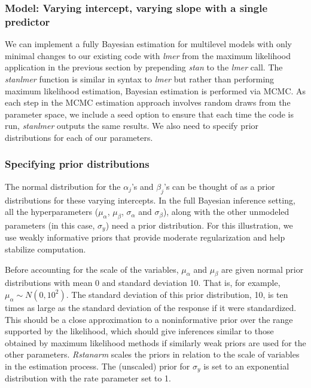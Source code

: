 \subsubsection*{Model: Varying intercept, varying slope with a single predictor}

We can implement a fully Bayesian estimation for multilevel models with only minimal changes to our existing code with \textit{lmer} from the maximum likelihood application in the previous section by prepending \textit{stan\textunderscore} to the \textit{lmer} call. The \textit{stan\textunderscore lmer} function is similar in syntax to \textit{lmer} but rather than performing maximum likelihood estimation, Bayesian estimation is performed via MCMC. As each step in the MCMC estimation approach involves random draws from the parameter space, we include a seed option to ensure that each time the code is run, \textit{stan\textunderscore lmer} outputs the same results. We also need to specify prior distributions for each of our parameters.

\subsubsection*{Specifying prior distributions}

The normal distribution for the $\alpha_{j}$'s and $\beta_{j}$'s can be thought of as a prior distributions for these varying intercepts. In the full Bayesian inference setting, all the hyperparameters ($\mu_{\alpha}$, $\mu_{\beta}$, $\sigma_{\alpha}$ and $\sigma_{\beta}$), along with the other unmodeled parameters (in this case, $\sigma_{y}$) need a prior distribution. For this illustration, we use weakly informative priors that provide moderate regularization and help stabilize computation.

Before accounting for the scale of the variables, $\mu_{\alpha}$ and $\mu_{\beta}$ are given normal prior distributions with mean 0 and standard deviation 10.  That is, for example, $\mu_{\alpha} \sim N(0, 10^2)$. The standard deviation of this prior distribution, 10, is ten times as large as the standard deviation of the response if it were standardized. This should be a close approximation to a noninformative prior over the range supported by the likelihood, which should give inferences similar to those obtained by maximum likelihood methods if similarly weak priors are used for the other parameters. \textit{Rstanarm} scales the priors in relation to the scale of variables in the estimation process. The (unscaled) prior for $\sigma_{y}$ is set to an exponential distribution with the rate parameter set to 1.


